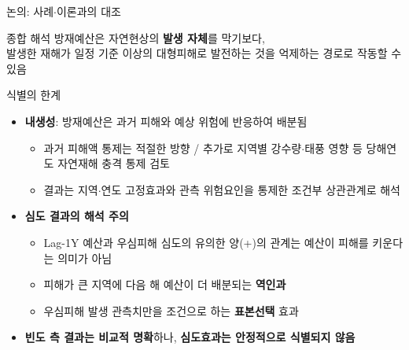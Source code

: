 \documentclass[aspectratio=169,10pt]{beamer}
\begin{document}
\begin{frame}{논의: 사례$\cdot$이론과의 대조}
  \centering
  \vspace{1.2em}

  \begin{alertblock}{종합 해석}
    방재예산은 자연현상의 \textbf{발생 자체}를 막기보다,\\
    발생한 재해가 \alert{일정 기준 이상의 대형피해로 발전하는 것을 억제}하는 경로로 작동할 수 있음
  \end{alertblock}
\end{frame}

\begin{frame}{식별의 한계}
  \begin{itemize}
    \item \textbf{내생성}: 방재예산은 과거 피해와 예상 위험에 반응하여 배분됨
    \begin{itemize}\small
      \item 과거 피해액 통제는 적절한 방향 / 추가로 지역별 강수량$\cdot$태풍 영향 등 당해연도 자연재해 충격 통제 검토
      \item 결과는 \alert{지역$\cdot$연도 고정효과와 관측 위험요인을 통제한 조건부 상관관계}로 해석
    \end{itemize}
    \vspace{4pt}
    \item \textbf{심도 결과의 해석 주의}
    \begin{itemize}\small
      \item Lag-1Y 예산과 우심피해 심도의 유의한 양(+)의 관계는 예산이 피해를 키운다는 의미가 아님
      \item 피해가 큰 지역에 다음 해 예산이 더 배분되는 \textbf{역인과}
      \item 우심피해 발생 관측치만을 조건으로 하는 \textbf{표본선택} 효과
    \end{itemize}
    \vspace{4pt}
    \item[$\Rightarrow$] \textbf{빈도 측 결과는 비교적 명확}하나, \textbf{심도효과는 안정적으로 식별되지 않음}
  \end{itemize}
\end{frame}
\end{document}
